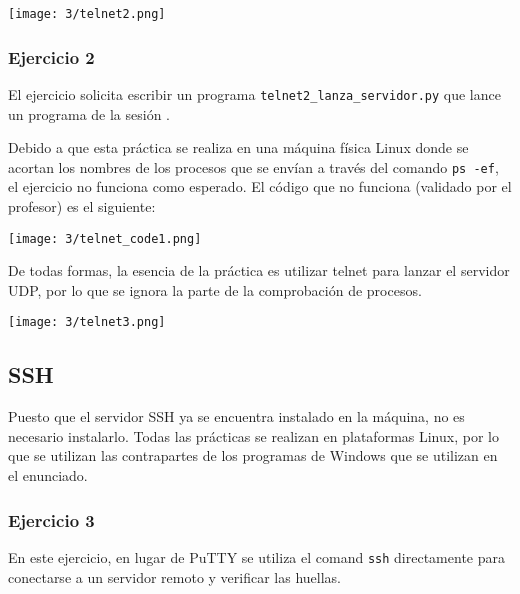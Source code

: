 \begin{minipage}{\linewidth}
    \centering
    \texttt{[image: 3/telnet2.png]}
    \label{fig:3/3}
\end{minipage}

\subsubsection{Ejercicio 2}

El ejercicio solicita escribir un programa \Verb#telnet2_lanza_servidor.py#
que lance un programa de la sesión .

Debido a que esta práctica se realiza en una máquina física Linux donde se acortan
los nombres de los procesos que se envían a través del comando \Verb#ps -ef#, el
ejercicio no funciona como esperado. El código que no funciona (validado por el
profesor) es el siguiente:

\begin{minipage}{\linewidth}
    \centering
    \texttt{[image: 3/telnet\_code1.png]}
    \label{fig:3/4}
\end{minipage}

De todas formas, la esencia de la práctica es utilizar telnet para lanzar el servidor
UDP, por lo que se ignora la parte de la comprobación de procesos.

\begin{minipage}{\linewidth}
    \centering
    \texttt{[image: 3/telnet3.png]}
    \label{fig:3/5}
\end{minipage}

\subsection{SSH}
Puesto que el servidor SSH ya se encuentra instalado en la máquina, no es necesario
instalarlo. Todas las prácticas se realizan en plataformas Linux, por lo que se
utilizan las contrapartes de los programas de Windows que se utilizan en el enunciado.

\subsubsection{Ejercicio 3}
En este ejercicio, en lugar de PuTTY se utiliza el comand \Verb#ssh# directamente
para conectarse a un servidor remoto y verificar las huellas.

